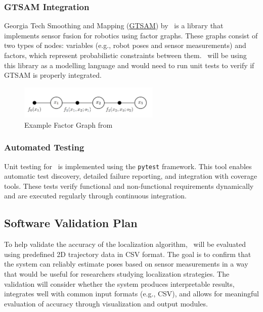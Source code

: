 \documentclass[12pt, titlepage]{article}
\begin{document}
\subsubsection{GTSAM Integration}
Georgia Tech Smoothing and Mapping (\href{https://github.com/borglab/gtsam}{GTSAM}) by~\cite{gtsam2022} is a library that implements sensor fusion for robotics using factor graphs. These graphs consist of two types of nodes: variables (e.g., robot poses and sensor measurements) and factors, which represent probabilistic constraints between them. \progname~will be using this library as a modelling language and would need to run unit tests to verify if GTSAM is properly integrated.

\begin{figure}[H]
  \begin{center}
    \includegraphics[width=0.6\textwidth]{factor_graph.png}
    \caption{Example Factor Graph from \cite{Dellaert2012}}
    \label{fig_factor} 
  \end{center}
\end{figure}

\subsubsection{Automated Testing}
Unit testing for \progname~is implemented using the \texttt{pytest} framework. This tool enables automatic test discovery, detailed failure reporting, and integration with coverage tools. These tests verify functional and non-functional requirements dynamically and are executed regularly through continuous integration.

\subsection{Software Validation Plan}\label{plan_software}

To help validate the accuracy of the localization algorithm, \progname~will be evaluated using predefined 2D trajectory data in CSV format. The goal is to confirm that the system can reliably estimate poses based on sensor measurements in a way that would be useful for researchers studying localization strategies. The validation will consider whether the system produces interpretable results, integrates well with common input formats (e.g., CSV), and allows for meaningful evaluation of accuracy through visualization and output modules.
\end{document}
